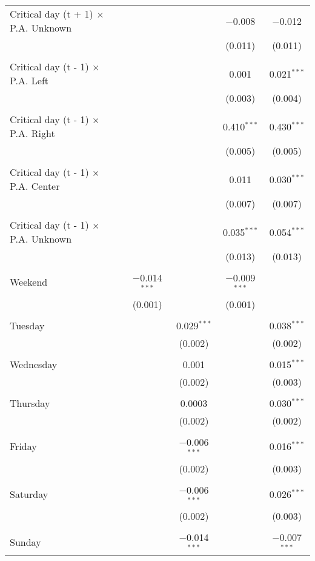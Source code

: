 \documentclass[
]{article}
\begin{document}
\begin{table}[!htbp]
{\begin{tabular}{@{\extracolsep{5pt}}lcccc}
 Critical day (t + 1) $\times$ P.A. Unknown &  &  & $-$0.008 & $-$0.012 \\ 
  &  &  & (0.011) & (0.011) \\ 
  & & & & \\ 
 Critical day (t - 1) $\times$ P.A. Left &  &  & 0.001 & 0.021$^{***}$ \\ 
  &  &  & (0.003) & (0.004) \\ 
  & & & & \\ 
 Critical day (t - 1) $\times$ P.A. Right &  &  & 0.410$^{***}$ & 0.430$^{***}$ \\ 
  &  &  & (0.005) & (0.005) \\ 
  & & & & \\ 
 Critical day (t - 1) $\times$ P.A. Center &  &  & 0.011 & 0.030$^{***}$ \\ 
  &  &  & (0.007) & (0.007) \\ 
  & & & & \\ 
 Critical day (t - 1) $\times$ P.A. Unknown &  &  & 0.035$^{***}$ & 0.054$^{***}$ \\ 
  &  &  & (0.013) & (0.013) \\ 
  & & & & \\ 
 Weekend & $-$0.014$^{***}$ &  & $-$0.009$^{***}$ &  \\ 
  & (0.001) &  & (0.001) &  \\ 
  & & & & \\ 
 Tuesday &  & 0.029$^{***}$ &  & 0.038$^{***}$ \\ 
  &  & (0.002) &  & (0.002) \\ 
  & & & & \\ 
 Wednesday &  & 0.001 &  & 0.015$^{***}$ \\ 
  &  & (0.002) &  & (0.003) \\ 
  & & & & \\ 
 Thursday &  & 0.0003 &  & 0.030$^{***}$ \\ 
  &  & (0.002) &  & (0.002) \\ 
  & & & & \\ 
 Friday &  & $-$0.006$^{***}$ &  & 0.016$^{***}$ \\ 
  &  & (0.002) &  & (0.003) \\ 
  & & & & \\ 
 Saturday &  & $-$0.006$^{***}$ &  & 0.026$^{***}$ \\ 
  &  & (0.002) &  & (0.003) \\ 
  & & & & \\ 
 Sunday &  & $-$0.014$^{***}$ &  & $-$0.007$^{***}$ \\ 

\end{tabular}}
\end{table}
\end{document}
